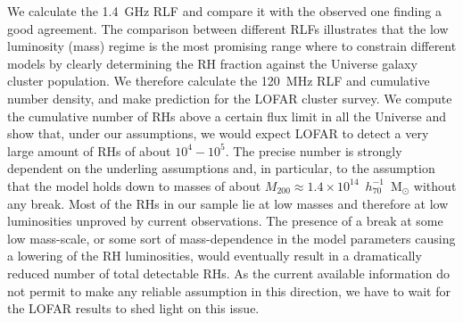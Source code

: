 \documentclass[traditabstract]{aa}
\newcommand{\rmn}{\mathrm}
\begin{document}
We calculate the 1.4~GHz RLF and compare it with the observed one \citep{1999NewA....4..141G} finding a good agreement. 
The comparison between different RLFs illustrates that the low luminosity (mass) regime is the most promising range where to constrain different models by clearly determining the RH fraction against the Universe galaxy cluster population.
%
We therefore calculate the 120~MHz RLF and cumulative number density, and make prediction for the LOFAR cluster survey. 
We compute the cumulative number of RHs above a certain flux limit in all the Universe and show that, under our assumptions, we would expect LOFAR to detect a very large amount of RHs of about $10^{4}-10^{5}$. The precise number is strongly dependent on the underling assumptions and, in particular, to the assumption that the model holds down to masses of about $M_{200}\approx1.4\times10^{14}$~$h_{70}^{-1}$~M$_{\odot}$ without any break. Most of the RHs in our sample lie at low masses and therefore at low luminosities unproved by current observations. The presence of a break at some low mass-scale, or some sort of mass-dependence in the model parameters causing a lowering of the RH luminosities, would eventually result in a dramatically reduced number of total detectable RHs. As the current available information do not permit to make any reliable assumption in this direction, we have to wait for the LOFAR results to shed light on this issue. 
\end{document}
